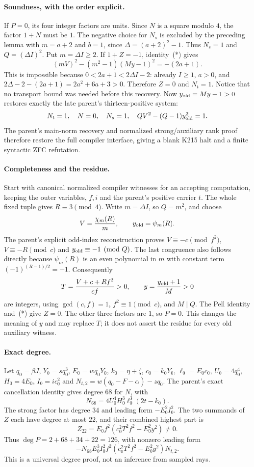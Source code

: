 \paragraph{Soundness, with the order explicit.}
If $P=0$, its four integer factors are units. Since $N$ is a square modulo
$4$, the factor $1+N$ must be $1$. The negative choice for $N_s$ is excluded
by the preceding lemma with $m=a+2$ and $b=1$, since
$\Delta=(a+2)^2-1$. Thus $N_s=1$ and
$Q=(\Delta I)^2$. Put $m=\Delta I\ge2$.
If $1+Z=-1$, identity~(*) gives
\[
(mV)^2-(m^2-1)(My-1)^2=-(2a+1).
\]
This is impossible because
$0<2a+1<2\Delta I-2$: already $I\ge1$, $a>0$, and
$2\Delta-2-(2a+1)=2a^2+6a+3>0$.
Therefore $Z=0$ and $N_t=1$. Notice that no transport bound was needed
before this recovery. Now $y_{\rm old}=My-1>0$ restores exactly the late
parent's thirteen-positive system:
\[
N_t=1,\quad N=0,\quad N_s=1,\quad
QV^2-(Q-1)y_{\rm old}^2=1.
\]
The parent's main-norm recovery and normalized strong/auxiliary rank proof
therefore restore the full compiler interface, giving a blank K215 halt
and a finite syntactic ZFC refutation.

\paragraph{Completeness and the residue.}
Start with canonical normalized compiler witnesses for an accepting
computation, keeping the outer variables, $f,i$ and the parent's positive
carrier $t$. The whole fixed tuple gives $R\equiv3\pmod4$.
Write $m=\Delta I$, so $Q=m^2$, and choose
\[
V=\frac{\chi_m(R)}m,\qquad y_{\rm old}=\psi_m(R).
\]
The parent's explicit odd-index reconstruction proves
$V\equiv-c\pmod{f^2}$, $V\equiv-R\pmod c$ and
$y_{\rm old}\equiv-1\pmod Q$.
The last congruence also follows directly because $\psi_m(R)$ is an even
polynomial in $m$ with constant term $(-1)^{(R-1)/2}=-1$.
Consequently
\[
T=\frac{V+c+Rf^2}{cf}>0,
\qquad y=\frac{y_{\rm old}+1}{M}>0
\]
are integers, using $\gcd(c,f)=1$, $f^2\equiv1\pmod c$, and $M\mid Q$.
The Pell identity and~(*) give $Z=0$. The other three factors are $1$, so
$P=0$. This changes the meaning of $y$ and may replace $T$; it does not
assert the residue for every old auxiliary witness.

\paragraph{Exact degree.}
Let $q_0=\beta J$, $Y_0=sq_0^3$, $E_0=wq_0Y_0$,
$k_0=\eta+\zeta$, $c_0=k_0Y_0$, $\ell_0=E_0c_0$,
$U_0=4q_0^4$, $H_0=4E_0$, $I_0=ic_0^2$ and
$N_{t,2}=w(q_0-F-\alpha)-zq_0$.
The parent's exact cancellation identity gives degree $68$ for $N$, with
\[
N_{68}=4U_0^4H_0^3\ell_0^3(2t-k_0).
\]
The strong factor has degree $34$ and leading form $-E_0^2I_0^2$.
The two summands of $Z$ each have degree at most $22$, and their combined
highest part is
\[
Z_{22}=E_0f^2(c_0^2T^2f^2-E_0^2y^2)\ne0.
\]
Thus $\deg P=2+68+34+22=126$, with nonzero leading form
\[
-N_{68}E_0^3I_0^2f^2(c_0^2T^2f^2-E_0^2y^2)N_{t,2}.
\]
This is a universal degree proof, not an inference from sampled rays.

